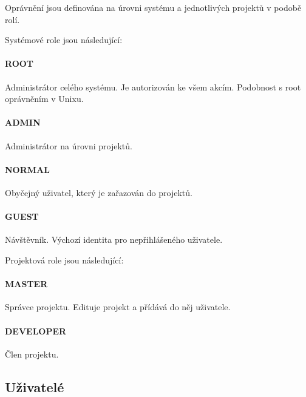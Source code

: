 Oprávnění jsou definována na úrovni systému a jednotlivých projektů v podobě rolí.

\noindent\makebox[\linewidth]{\rule{\textwidth}{0.4pt}}

Systémové role jsou následující:

\paragraph{ROOT}

Administrátor celého systému.
Je autorizován ke všem akcím.
Podobnost s root oprávněním v Unixu.

\paragraph{ADMIN}

Administrátor na úrovni projektů.

\paragraph{NORMAL}

Obyčejný uživatel, který je zařazován do projektů.

\paragraph{GUEST}

Návštěvník.
Výchozí identita pro nepřihlášeného uživatele.

\noindent\makebox[\linewidth]{\rule{\textwidth}{0.4pt}}

Projektová role jsou následující:

\paragraph{MASTER}

Správce projektu.
Edituje projekt a přídává do něj uživatele.

\paragraph{DEVELOPER}

Člen projektu.

\noindent\makebox[\linewidth]{\rule{\textwidth}{0.4pt}}

\subsection{Uživatelé}


